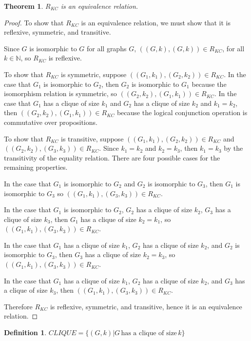 \documentclass[draft]{article}
\newtheorem{theorem}{Theorem}%
\theoremstyle{definition}
\newtheorem{definition}{Definition}%
\newcommand{\plain}[1]{\,\text{#1}\,} %
\begin{document}
\begin{theorem}$R_{KC}$ is an equivalence relation.\end{theorem}
\begin{proof}To show that $R_{KC}$ is an equivalence relation, we must show
  that it is reflexive, symmetric, and transitive.

  Since $G$ is isomorphic to $G$ for all graphs $G$, $((G,k),(G,k))\in R_{KC}$,
  for all $k\in\mathbb{N}$, so $R_{KC}$ is reflexive.

  To show that $R_{KC}$ is symmetric, suppose $((G_1, k_1), (G_2, k_2))\in
  R_{KC}$. In the case that $G_1$ is isomorphic to $G_2$, then $G_2$ is
  isomorphic to $G_1$ because the isomorphism relation is symmetric, so
  $((G_2,k_2),(G_1,k_1))\in R_{KC}$. In the case that $G_1$ has a clique of
  size $k_1$ and $G_2$ has a clique of size $k_2$ and $k_1=k_2$, then
  $((G_2,k_2),(G_1,k_1))\in R_{KC}$ because the logical conjunction operation
  is commutative over propositions.

  To show that $R_{KC}$ is transitive, suppose $((G_1, k_1), (G_2, k_2))\in
  R_{KC}$ and $((G_2, k_2), (G_3, k_3))\in R_{KC}$. Since $k_1=k_2$ and
  $k_2=k_3$, then $k_1=k_3$ by the transitivity of the equality relation. There
  are four possible cases for the remaining properties.

  In the case that $G_1$ is isomorphic to $G_2$ and $G_2$ is isomorphic to
  $G_3$, then $G_1$ is isomorphic to $G_3$ so $((G_1, k_1), (G_3, k_3))\in
  R_{KC}$.

  In the case that $G_1$ is isomorphic to $G_2$, $G_2$ has a clique of size
  $k_2$, $G_3$ has a clique of size $k_3$, then $G_1$ has a clique of size
  $k_2=k_1$, so $((G_1, k_1), (G_3, k_3))\in R_{KC}$.

  In the case that $G_1$ has a clique of size $k_1$, $G_2$ has a clique of size
  $k_2$, and $G_2$ is isomorphic to $G_3$, then $G_3$ has a clique
  of size $k_2=k_3$, so $((G_1, k_1), (G_3, k_3))\in R_{KC}$.

  In the case that $G_1$ has a clique of size $k_1$, $G_2$ has a clique of size
  $k_2$, and $G_3$ has a clique of size $k_3$, then $((G_1, k_1), (G_3,
  k_3))\in R_{KC}$.

  Therefore $R_{KC}$ is reflexive, symmetric, and transitive, hence it is an
  equivalence relation.
\end{proof}

\begin{definition}
  $CLIQUE=\{(G,k)|G \plain{has a clique of size} k\}$
\end{definition}
\end{document}
